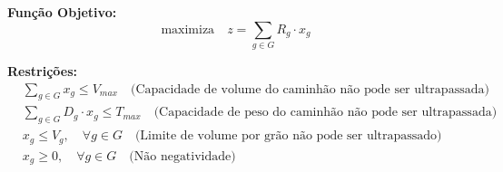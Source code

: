 \documentclass{article}
\begin{document}
\textbf{Função Objetivo:}
\[
\text{maximiza} \quad z = \sum_{g \in G} R_g \cdot x_g
\]

\textbf{Restrições:}
\begin{align*}
    &\sum_{g \in G} x_g \leq V_{max} \quad \text{(Capacidade de volume do caminhão não pode ser ultrapassada)} \\
    &\sum_{g \in G} D_g \cdot x_g \leq T_{max} \quad \text{(Capacidade de peso do caminhão não pode ser ultrapassada)} \\
    &x_g \leq V_g, \quad \forall g \in G \quad \text{(Limite de volume por grão não pode ser ultrapassado)} \\
    &x_g \geq 0, \quad \forall g \in G \quad \text{(Não negatividade)}
\end{align*}
\end{document}

